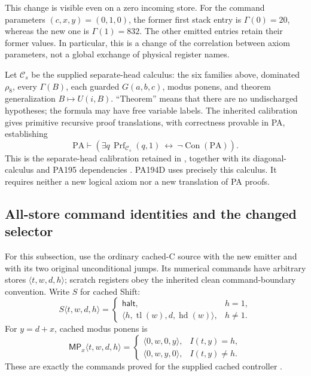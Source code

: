 This change is visible even on a zero incoming store.  For the command
parameters \((c,x,y)=(0,1,0)\), the former first stack entry is
\(\Gamma(0)=20\), whereas the new one is \(\Gamma(1)=832\).
The other emitted entries retain their former values.  In particular,
this is a change of the correlation between axiom parameters, not a
global exchange of physical register names.

Let \(\mathcal C_s\) be the supplied separate-head calculus: the six
families above, dominated \(\rho_8\), every \(\Gamma(B)\), each
guarded \(G(a,b,c)\), modus ponens, and theorem generalization
\(B\mapsto U(i,B)\).  ``Theorem'' means that there are no undischarged
hypotheses; the formula may have free variable labels.  The inherited
calibration gives primitive recursive proof translations, with
correctness provable in PA, establishing
\[
 \mathrm{PA}\vdash
 \left(\exists q\,\operatorname{Prf}_{\mathcal C_s}(q,1)
                   \ \leftrightarrow\ \neg\operatorname{Con}(\mathrm{PA})\right).
 \tag{D-Cal}\label{eq:gammad-cal}
\]
This is the separate-head calibration retained in
,
together with its diagonal-calculus and PA195 dependencies
\cite{pa194}.  PA194D uses precisely this calculus.  It requires neither
a new logical axiom nor a new translation of PA proofs.

\subsection{All-store command identities and the changed selector}

For this subsection, use the ordinary cached-C source with the new
emitter and with its two original unconditional jumps.  Its numerical
commands have arbitrary stores \(\langle t,w,d,h\rangle\); scratch
registers obey the inherited clean command-boundary convention.  Write
\(S\) for cached Shift:
\[
 S\langle t,w,d,h\rangle=
 \begin{cases}
 \mathsf{halt},&h=1,\\
 \langle h,\operatorname{tl}(w),d,\operatorname{hd}(w)\rangle,&h\ne1.
 \end{cases}
\]
For \(y=d+x\), cached modus ponens is
\[
 \mathsf{MP}_x\langle t,w,d,h\rangle=
 \begin{cases}
 \langle0,w,0,y\rangle,&I(t,y)=h,\\
 \langle0,w,y,0\rangle,&I(t,y)\ne h.
 \end{cases}
\]
These are exactly the commands proved for the supplied cached
controller \cite{cached}.

